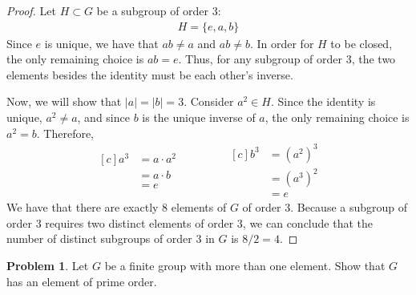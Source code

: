 \documentclass[12pt,reqno]{article}
\theoremstyle{plain}
\theoremstyle{definition}
\newtheorem{problem}{Problem}
\begin{document}
\begin{proof}
    Let \(H\subset G\) be a subgroup of order 3:
    \begin{align*}
        H = \{e, a, b\}
    \end{align*}
    Since \(e\) is unique, we have that \(ab\neq a\) and \(ab\neq b\). In order for \(H\) to be closed, 
    the only remaining choice is \(ab = e\). Thus, for any subgroup of order \(3\), the two elements besides
    the identity must be each other's inverse.

    Now, we will show that \(|a|=|b|=3\). Consider \(a^2\in H\). Since the identity is unique, \(a^2\neq a\),
    and since \(b\) is the unique inverse of \(a\), the only remaining choice is \(a^2=b\). Therefore,
    \begin{equation*}
        \begin{aligned}[c]
            a^3 &= a \cdot a^2 \\
            &= a \cdot b\\
            &= e
        \end{aligned}
        \qquad\qquad
        \begin{aligned}[c]
            b^3 &= (a^2)^3\\
            &= (a^3)^2\\
            &= e
        \end{aligned}
    \end{equation*}
    We have that there are exactly \(8\) elements of \(G\) of order \(3\). Because a subgroup of order \(3\) 
    requires two distinct elements of order \(3\), we can conclude that the number of distinct subgroups of 
    order \(3\) in \(G\) is \(8 / 2 = 4\).

    

\end{proof}

\newpage


\begin{problem} 
    Let $G$ be a finite group with more than one element. Show that $G$ has an element of prime order.
\end{problem}
\end{document}
